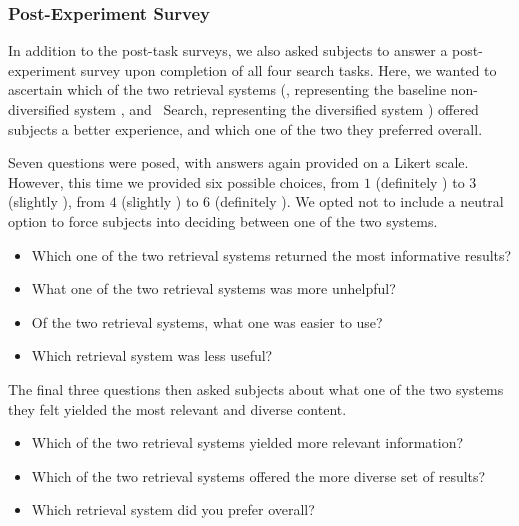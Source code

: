 \subsubsection{Post-Experiment Survey}\label{sec:diversity:users:postexp}
In addition to the post-task surveys, we also asked subjects to answer a post-experiment survey upon completion of all four search tasks. Here, we wanted to ascertain which of the two retrieval systems (\hula, representing the baseline non-diversified system , and \yoyo~Search, representing the diversified system ) offered subjects a better experience, and which one of the two they preferred overall.

Seven questions were posed, with answers again provided on a Likert scale. However, this time we provided six possible choices, from $1$ (definitely \hula) to $3$ (slightly \hula), from $4$ (slightly \yoyo) to $6$ (definitely \yoyo). We opted not to include a neutral option to force subjects into deciding between one of the two systems.

\vspace*{-2mm}
\begin{itemize}
    \item{ Which one of the two retrieval systems returned the most informative results?}
    \item{ What one of the two retrieval systems was more unhelpful?}
    \item{ Of the two retrieval systems, what one was easier to use?}
    \item{ Which retrieval system was less useful?}
\end{itemize}

The final three questions then asked subjects about what one of the two systems they felt yielded the most relevant and diverse content.

\vspace*{-2mm}
\begin{itemize}
    \item{ Which of the two retrieval systems yielded more relevant information?}
    \item{ Which of the two retrieval systems offered the more diverse set of results?}
    \item{ Which retrieval system did you prefer overall?}
\end{itemize}

